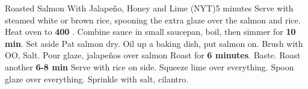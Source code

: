 \documentclass[a6paper,landscape]{article}
\begin{document}
\begin{recipe}{Roasted Salmon With Jalapeño, Honey and Lime    (NYT)}{5 minutes}{}
  \freeform Serve with steamed white or brown rice, spooning the extra glaze over the salmon and rice.
  Heat oven to \textbf{400 \textdegree}. Combine sauce in small saucepan, boil, then simmer for \textbf{10 min}. Set aside
  Pat salmon dry. Oil up a baking dish, put salmon on. Brush with OO, Salt. Pour glaze, jalapeños over salmon
  \newstep Roast for \textbf{6 minutes}. Baste. Roast another \textbf{6-8 min}
  Serve with rice on side. Squeeze lime over everything. Spoon glaze over everything. Sprinkle with salt, cilantro. 
  \end{recipe}
\end{document}
